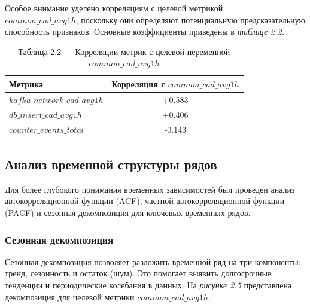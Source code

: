 Особое внимание уделено корреляциям с целевой метрикой \\
$common\_cad\_avg1h$, поскольку они определяют потенциальную предсказательную способность признаков. Основные коэффициенты приведены в \textit{таблице 2.2}.

\begin{table}[H]
	\centering
	\caption*{Таблица 2.2 --- Корреляции метрик с целевой переменной $common\_cad\_avg1h$}
	\begin{tabular}{|l|c|}
		\hline
		\textbf{Метрика} & \textbf{Корреляция с $common\_cad\_avg1h$} \\
		\hline
		$kafka\_network\_cad\_avg1h$ & +0.583 \\
		$db\_insert\_cad\_avg1h$ & +0.406 \\
		$counter\_events\_total$ & -0.143 \\
		\hline
	\end{tabular}
	\label{tab:target_correlations}
\end{table}

\subsection{Анализ временной структуры рядов}

Для более глубокого понимания временных зависимостей был проведен анализ автокорреляционной функции (ACF), частной автокорреляционной функции (PACF) и сезонная декомпозиция для ключевых временных рядов.

\subsubsection{Сезонная декомпозиция}

Сезонная декомпозиция позволяет разложить временной ряд на три компоненты: тренд, сезонность и остаток (шум). Это помогает выявить долгосрочные тенденции и периодические колебания в данных. На \textit{рисунке 2.5} представлена декомпозиция для целевой метрики $common\_cad\_avg1h$.

